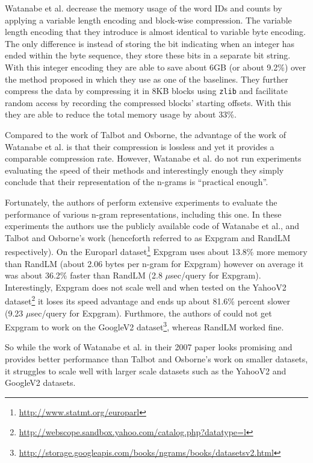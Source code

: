\documentclass[sigconf, nonacm=true]{acmart}
\begin{document}
Watanabe et al. decrease the memory usage of the word IDs and counts by applying a variable length encoding and block-wise compression. The variable length encoding that they introduce is almost identical to variable byte encoding. The only difference is instead of storing the bit indicating when an integer has ended within the byte sequence, they store these bits in a separate bit string. With this integer encoding they are able to save about 6GB (or about 9.2\%) over the method proposed in \cite{raj2003lossless} which they use as one of the baselines. They further compress the data by compressing it in 8KB blocks using \texttt{zlib} and facilitate random access by recording the compressed blocks' starting offsets. With this they are able to reduce the total memory usage by about 33\%.

Compared to the work of Talbot and Osborne, the advantage of the work of Watanabe et al. is that their compression is lossless and yet it provides a comparable compression rate. However, Watanabe et al. do not run experiments evaluating the speed of their methods and interestingly enough they simply conclude that their representation of the n-grams is ``practical enough''. 

Fortunately, the authors of \cite{pibiri2019handling} perform extensive experiments to evaluate the performance of various n-gram representations, including this one. In these experiments the authors use the publicly available code of Watanabe et al., and Talbot and Osborne's work (henceforth referred to as Expgram and RandLM respectively). On the Europarl dataset\footnote{\url{http://www.statmt.org/europarl}} Expgram uses about 13.8\% more memory than RandLM (about 2.06 bytes per n-gram for Expgram) however on average it was about 36.2\% faster than RandLM (2.8 $\mu$sec/query for Expgram). Interestingly, Expgram does not scale well and when tested on the YahooV2 dataset\footnote{\url{http://webscope.sandbox.yahoo.com/catalog.php?datatype=l}} it loses its speed advantage and ends up about 81.6\% percent slower (9.23 $\mu$sec/query for Expgram). Furthmore, the authors of \cite{pibiri2019handling} could not get Expgram to work on the GoogleV2 dataset\footnote{\url{http://storage.googleapis.com/books/ngrams/books/datasetsv2.html}}, whereas RandLM worked fine.

So while the work of Watanabe et al. in their 2007 paper looks promising and provides better performance than Talbot and Osborne's work on smaller datasets, it struggles to scale well with larger scale datasets such as the YahooV2 and GoogleV2 datasets.
\end{document}
